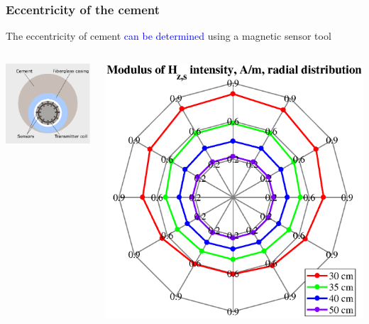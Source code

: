 \documentclass[aspectratio=169]{beamer}
\begin{document}
\begin{frame}
\frametitle{Eccentricity of the cement}

The eccentricity of cement \textcolor{blue} {can be determined} using a magnetic sensor tool

\begin{columns}[c] 
\includegraphics[scale=1.31]{tool_face_ecctr.eps}


\includegraphics[scale=0.41]{cement_ecctr.eps}
\end{columns}
\end{frame}
\end{document}
